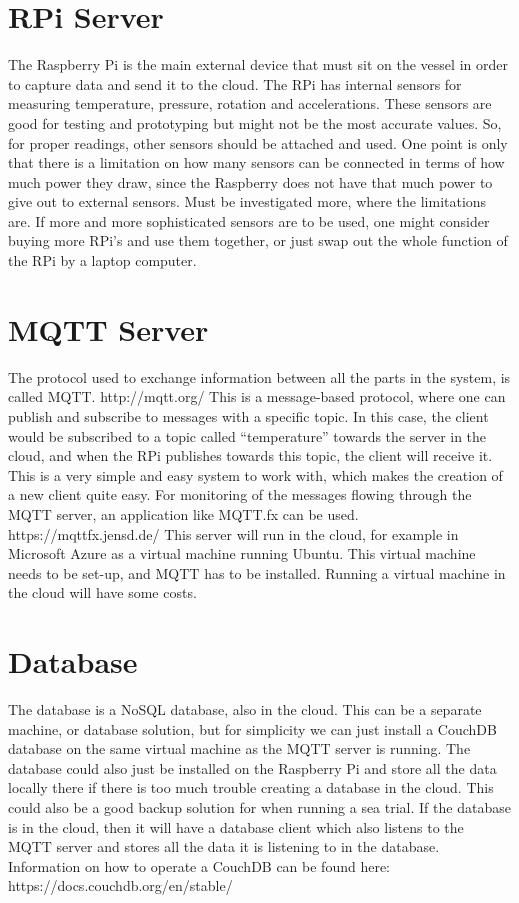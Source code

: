 \documentclass{article}
\begin{document}
\section{RPi Server}
The Raspberry Pi is the main external device that must sit on the vessel in order to capture data and send it to the cloud. The RPi has internal sensors for measuring temperature, pressure, rotation and accelerations. These sensors are good for testing and prototyping but might not be the most accurate values. So, for proper readings, other sensors should be attached and used. One point is only that there is a limitation on how many sensors can be connected in terms of how much power they draw, since the Raspberry does not have that much power to give out to external sensors. Must be investigated more, where the limitations are.
If more and more sophisticated sensors are to be used, one might consider buying more RPi’s and use them together, or just swap out the whole function of the RPi by a laptop computer.

\section{MQTT Server}
The protocol used to exchange information between all the parts in the system, is called MQTT.
http://mqtt.org/
This is a message-based protocol, where one can publish and subscribe to messages with a specific topic. In this case, the client would be subscribed to a topic called “temperature” towards the server in the cloud, and when the RPi publishes towards this topic, the client will receive it. This is a very simple and easy system to work with, which makes the creation of a new client quite easy.
For monitoring of the messages flowing through the MQTT server, an application like MQTT.fx can be used. https://mqttfx.jensd.de/
This server will run in the cloud, for example in Microsoft Azure as a virtual machine running Ubuntu.
This virtual machine needs to be set-up, and MQTT has to be installed. Running a virtual machine in the cloud will have some costs.

\section{Database}
The database is a NoSQL database, also in the cloud. This can be a separate machine, or database solution, but for simplicity we can just install a CouchDB database on the same virtual machine as the MQTT server is running.
The database could also just be installed on the Raspberry Pi and store all the data locally there if there is too much trouble creating a database in the cloud. This could also be a good backup solution for when running a sea trial.
If the database is in the cloud, then it will have a database client which also listens to the MQTT server and stores all the data it is listening to in the database.
Information on how to operate a CouchDB can be found here: https://docs.couchdb.org/en/stable/
\end{document}
